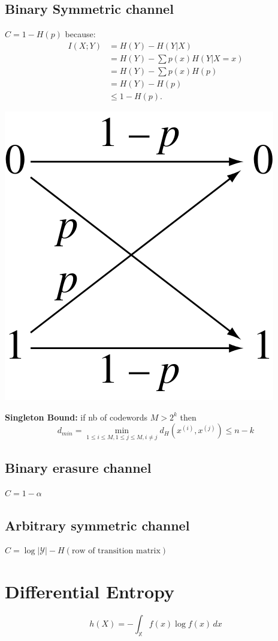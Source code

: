 \documentclass[10pt,a4paper,landscape]{article}
\begin{document}
\begin{multicols*}{4}
\subsection{Binary Symmetric channel}
$C = 1 - H(p)$ because:
\begin{align}
	I(X; Y) &= H(Y) - H(Y | X)\\
			&= H(Y) - \sum p(x) H(Y| X = x)\\
			&= H(Y) - \sum p(x) H(p)\\
			&= H(Y) - H(p)\\
			&\leq 1 - H(p).
\end{align}
\begin{colfig}
	\centering
	\includegraphics[width=0.6\linewidth]{binary-symmetric-channel.png}
\end{colfig}

\textbf{Singleton Bound:} if nb of codewords $M > 2^k$ then $$d_{min} = \min_{1\leq i \leq M, 1 \leq j \leq M, i \neq j} d_H(x^{(i)}, x^{(j)}) \leq n-k$$

\subsection{Binary erasure channel}
$C = 1 - \alpha$

\subsection{Arbitrary symmetric channel}
$C = \log | \mathcal{Y} | - H(\text{row of transition matrix})$

\section{Differential Entropy}
$$h(X) = -\int_\mathbb{X} f(x)\log f(x)\,dx$$


\end{multicols*}
\end{document}
